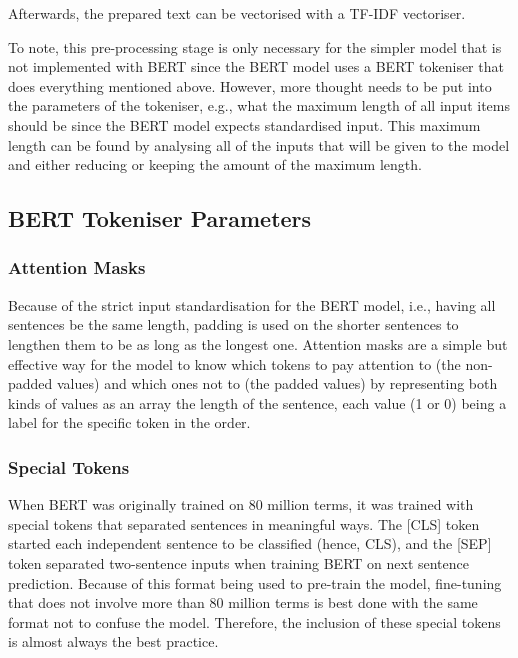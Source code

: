 \documentclass{l4proj}
\begin{document}
Afterwards, the prepared text can be vectorised with a TF-IDF vectoriser.

To note, this pre-processing stage is only necessary for the simpler model that is not implemented with BERT since the BERT model uses a BERT tokeniser that does everything mentioned above. However, more thought needs to be put into the parameters of the tokeniser, e.g., what the maximum length of all input items should be since the BERT model expects standardised input. This maximum length can be found by analysing all of the inputs that will be given to the model and either reducing or keeping the amount of the maximum length.

\subsection{BERT Tokeniser Parameters}
\label{subsec:BERTTokeniserParams}

\subsubsection{Attention Masks}

Because of the strict input standardisation for the BERT model, i.e., having all sentences be the same length, padding is used on the shorter sentences to lengthen them to be as long as the longest one. Attention masks are a simple but effective way for the model to know which tokens to pay attention to (the non-padded values) and which ones not to (the padded values) by representing both kinds of values as an array the length of the sentence, each value (1 or 0) being a label for the specific token in the order.

\subsubsection{Special Tokens}

When BERT was originally trained on 80 million terms, it was trained with special tokens that separated sentences in meaningful ways. The [CLS] token started each independent sentence to be classified (hence, CLS), and the [SEP] token separated two-sentence inputs when training BERT on next sentence prediction. Because of this format being used to pre-train the model, fine-tuning that does not involve more than 80 million terms is best done with the same format not to confuse the model. Therefore, the inclusion of these special tokens is almost always the best practice.
\end{document}
